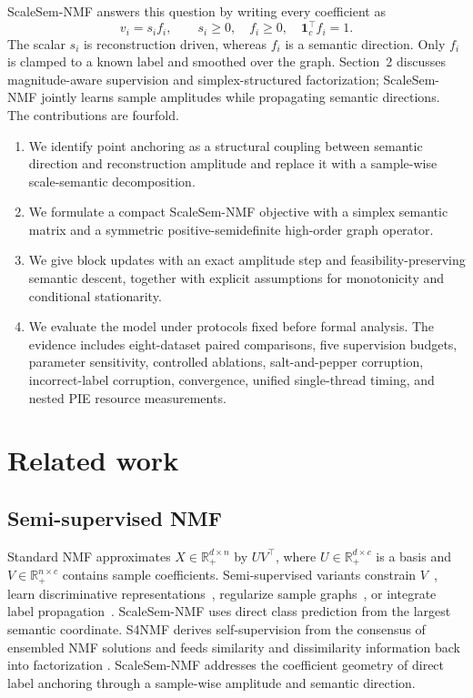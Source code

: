 \documentclass[a4paper,preprint,12pt]{elsarticle}
\theoremstyle{remark}
\begin{document}
ScaleSem-NMF answers this question by writing every coefficient as
\[
v_i=s_i f_i,\qquad s_i\ge 0,\quad f_i\ge 0,\quad \mathbf 1_c^\top f_i=1.
\]
The scalar \(s_i\) is reconstruction driven, whereas \(f_i\) is a semantic direction. Only \(f_i\) is clamped to a known label and smoothed over the graph. Section~2 discusses magnitude-aware supervision and simplex-structured factorization; ScaleSem-NMF jointly learns sample amplitudes while propagating semantic directions.
The contributions are fourfold.

\begin{enumerate}
\item We identify point anchoring as a structural coupling between semantic direction and reconstruction amplitude and replace it with a sample-wise scale-semantic decomposition.
\item We formulate a compact ScaleSem-NMF objective with a simplex semantic matrix and a symmetric positive-semidefinite high-order graph operator.
\item We give block updates with an exact amplitude step and feasibility-preserving semantic descent, together with explicit assumptions for monotonicity and conditional stationarity.
\item We evaluate the model under protocols fixed before formal analysis. The evidence includes eight-dataset paired comparisons, five supervision budgets, parameter sensitivity, controlled ablations, salt-and-pepper corruption, incorrect-label corruption, convergence, unified single-thread timing, and nested PIE resource measurements.
\end{enumerate}

\section{Related work}

\subsection{Semi-supervised NMF}

Standard NMF approximates \(X\in\mathbb R_+^{d\times n}\) by \(UV^\top\), where \(U\in\mathbb R_+^{d\times c}\) is a basis and \(V\in\mathbb R_+^{n\times c}\) contains sample coefficients. Semi-supervised variants constrain \(V\)~\cite{Liu2012CNMF}, learn discriminative representations~\cite{Xing2021DSSNMF}, regularize sample graphs~\cite{Cai2011GNMF}, or integrate label propagation~\cite{Yi2015LpSNMF}. ScaleSem-NMF uses direct class prediction from the largest semantic coordinate.
S4NMF derives self-supervision from the consensus of ensembled NMF solutions and feeds similarity and dissimilarity information back into factorization \cite{Chavoshinejad2023S4NMF}. ScaleSem-NMF addresses the coefficient geometry of direct label anchoring through a sample-wise amplitude and semantic direction.
\end{document}
